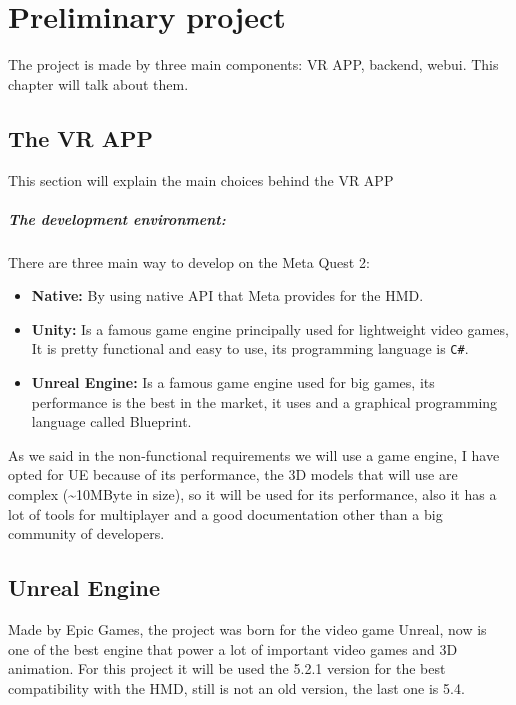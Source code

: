 
\chapter{Preliminary project}
\noindent
The project is made by three main components: \ac{VR} APP, backend, webui. This chapter will talk about them.
\section{The VR APP}
\noindent
This section will explain the main choices behind the \ac{VR} APP
\paragraph{The development environment:} 
There are three main way to develop on the Meta Quest 2:

\begin{itemize}
  \item \textbf{Native:} By using native \ac{API} that Meta provides for the \ac{HMD}.
  \item \textbf{Unity:} Is a famous game engine principally used for lightweight video games, It is pretty functional and easy to use, its programming language is \verb|C#|. 
  \item \textbf{Unreal Engine:} Is a famous game engine used for big games, its performance is the best in the market, it uses \cpp and a graphical programming language called Blueprint. 
\end{itemize}
\noindent
As we said in the non-functional requirements we will use a game engine, I have opted for \ac{UE} because of its performance, the 3D models that will use are complex (\textasciitilde10MByte in size),
so it will be used for its performance, also it has a lot of tools for multiplayer and a good documentation other than a big community of developers.

\section{Unreal Engine}
\noindent
Made by Epic Games, the project was born for the video game Unreal, now is one of the best engine that power a lot of important video games and 3D animation.
For this project it will be used the 5.2.1 version for the best compatibility with the \ac{HMD}, still is not an old version, the last one is 5.4. 

